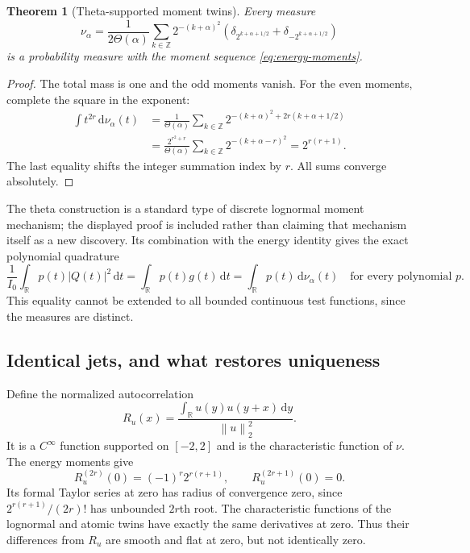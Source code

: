 \documentclass[11pt,a4paper]{article}
\numberwithin{equation}{section}
\newtheorem{theorem}{Theorem}[section]
\theoremstyle{definition}
\newcommand{\R}{\mathbb R}
\newcommand{\Z}{\mathbb Z}
\newcommand{\dd}{\,\mathrm d}
\newcommand{\norm}[1]{\left\lVert #1\right\rVert}
\begin{document}
\begin{theorem}[Theta-supported moment twins]\label{thm:theta}
Every measure
\begin{equation}
 \nu_\alpha=\frac1{2\Theta(\alpha)}
 \sum_{k\in\Z}2^{-(k+\alpha)^2}
 \left(\delta_{2^{k+\alpha+1/2}}+
       \delta_{-2^{k+\alpha+1/2}}\right)
 \label{eq:atomic-twin}
\end{equation}
is a probability measure with the moment sequence
\eqref{eq:energy-moments}.
\end{theorem}
\begin{proof}
The total mass is one and the odd moments vanish. For the even
moments, complete the square in the exponent:
\begin{align}
 \int t^{2r}\dd\nu_\alpha(t)
 &=\frac1{\Theta(\alpha)}
     \sum_{k\in\Z}2^{-(k+\alpha)^2+2r(k+\alpha+1/2)}\nonumber\\
 &=\frac{2^{r^2+r}}{\Theta(\alpha)}
     \sum_{k\in\Z}2^{-(k+\alpha-r)^2}
 =2^{r(r+1)}.
\end{align}
The last equality shifts the integer summation index by $r$.
All sums converge absolutely.
\end{proof}

The theta construction is a standard type of discrete lognormal
moment mechanism; the displayed proof is included rather than
claiming that mechanism itself as a new discovery. Its combination
with the energy identity gives the exact polynomial quadrature
\begin{equation}
 \frac1{I_0}\int_{\R}p(t)|Q(t)|^2\dd t
 =\int_{\R}p(t)g(t)\dd t
 =\int_{\R}p(t)\dd\nu_\alpha(t)
 \quad\text{for every polynomial }p.
 \label{eq:polynomial-quadrature}
\end{equation}
This equality cannot be extended to all bounded continuous test
functions, since the measures are distinct.

\subsection{Identical jets, and what restores uniqueness}

Define the normalized autocorrelation
\begin{equation}
 R_u(x)=\frac{\int_{\R}u(y)u(y+x)\dd y}{\norm{u}_2^2}.
 \label{eq:autocorrelation}
\end{equation}
It is a $C^\infty$ function supported on $[-2,2]$ and is the
characteristic function of $\nu$. The energy moments give
\begin{equation}
 R_u^{(2r)}(0)=(-1)^r2^{r(r+1)},\qquad R_u^{(2r+1)}(0)=0.
 \label{eq:autocorrelation-jet}
\end{equation}
Its formal Taylor series at zero has radius of convergence zero,
since $2^{r(r+1)}/(2r)!$ has unbounded $2r$th root. The
characteristic functions of the lognormal and atomic twins have
exactly the same derivatives at zero. Thus their differences from
$R_u$ are smooth and flat at zero, but not identically zero.
\end{document}
